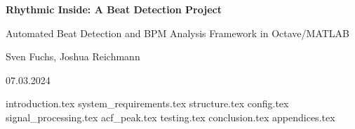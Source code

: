 \documentclass[a4paper,12pt,oneside]{article}
\begin{document}
\pagestyle{fancy}

\begin{titlepage}
    \centering
    \vspace*{1cm}
    
    {\Large\bfseries Rhythmic Inside: A Beat Detection Project\par}
    \vspace{0.5cm}
    {\large Automated Beat Detection and BPM Analysis Framework in Octave/MATLAB\par}
    
    \vspace{1.5cm}
    
    {\Large Sven Fuchs, Joshua Reichmann\par}
    \vspace{0.5cm}
    {\Large 07.03.2024\par}
    
    \vfill
\end{titlepage}

\tableofcontents
\newpage


{introduction.tex}
{system_requirements.tex}
{structure.tex}
{config.tex}
{signal_processing.tex}
{acf_peak.tex}
{testing.tex}
{conclusion.tex}
{appendices.tex}

\newpage
\printbibliography
\listoffigures
\end{document}
